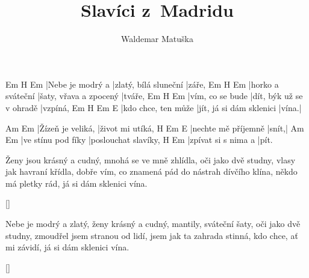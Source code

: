 \documentclass{song}
\title{Slavíci z~Madridu}
\author{Waldemar Matuška}
\begin{document}
\strophe
Em               H\7                   Em
|Nebe je modrý a |zlatý, bílá sluneční |záře,
Em                H\7                    Em
|horko a sváteční |šaty, vřava a zpocený |tváře,
Em               H\7                      Em
|vím, co se bude |dít, býk už se v ohradě |vzpíná,
Em                  H\7                      Em    E\7
|kdo chce, ten může |jít, já si dám sklenici |vína.|
\endstrophe

Am                Em
|Žízeň je veliká, |život mi utíká,
H\7                 Em    E\7
|nechte mě příjemně |snít,|
Am                 Em
|ve stínu pod fíky |poslouchat slavíky,
H\7                 Em
|zpívat si s nima a |pít.
\endstrophe

\strophe*
Ženy jsou krásný a cudný, mnohá se ve mně zhlídla,
oči jako dvě studny, vlasy jak havraní křídla,
dobře vím, co znamená pád do nástrah dívčího klína,
někdo má pletky rád, já si dám sklenici vína.
\endstrophe

\ref{}

\strophe*
Nebe je modrý a zlatý, ženy krásný a cudný,
mantily, sváteční šaty, oči jako dvě studny,
zmoudřel jsem stranou od lidí, jsem jak ta zahrada stinná,
kdo chce, ať mi závidí, já si dám sklenici vína.
\endstrophe

\ref{}
\end{document}
